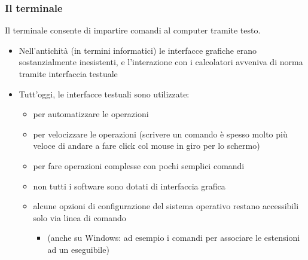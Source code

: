 \documentclass{beamer}
\begin{document}
\begin{frame}[fragile]
\frametitle{Il terminale}
Il terminale consente di impartire comandi al computer tramite testo.
\begin{itemize}
 \item Nell'antichità (in termini informatici) le interfacce grafiche erano sostanzialmente inesistenti, e l'interazione con i calcolatori avveniva di norma tramite interfaccia testuale
 \item Tutt'oggi, le interfacce testuali sono utilizzate:
\begin{itemize}
 \item per automatizzare le operazioni
 \item per velocizzare le operazioni (scrivere un comando è spesso molto più veloce di andare a fare click col mouse in giro per lo schermo)
 \item per fare operazioni complesse con pochi semplici comandi
 \item non tutti i software sono dotati di interfaccia grafica
 \item alcune opzioni di configurazione del sistema operativo restano accessibili solo via linea di comando
\begin{itemize}
 \item (anche su Windows: ad esempio i comandi per associare le estensioni ad un eseguibile)
\end{itemize}
\end{itemize}
\end{itemize}
\end{frame}
\end{document}
